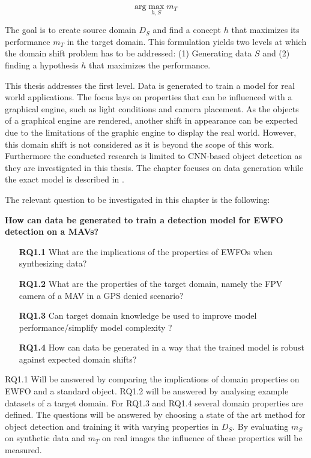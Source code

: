 $$
\text{arg}\max\limits_{h,S} m_T
$$

The goal is to create source domain $D_S$ and find a concept $h$ that maximizes its performance $m_T$ in the target domain. This formulation yields two levels at which the domain shift problem has to be addressed: (1) Generating data $S$ and (2) finding a hypothesis $h$ that maximizes the performance.

This thesis addresses the first level. Data is generated to train a model for real world applications. The focus lays on properties that can be influenced with a graphical engine, such as light conditions and camera placement. As the objects of a graphical engine are rendered, another shift in appearance can be expected due to the limitations of the graphic engine to display the real world. However, this domain shift is not considered as it is beyond the scope of this work. Furthermore the conducted research is limited to \ac{CNN}-based object detection as they are investigated in this thesis. The chapter focuses on data generation while the exact model is described in .

The relevant question to be investigated in this chapter is the following:

\textbf{How can data be generated to train a detection model for \ac{EWFO} detection on a \acp{MAV}?}

\begin{enumerate}
	\item[\textbf{RQ1.1}]What are the implications of the properties of \acp{EWFO} when synthesizing data?
	\item[\textbf{RQ1.2}]What are the properties of the target domain, namely the \ac{FPV} camera of a \ac{MAV} in a GPS denied scenario?
	\item[\textbf{RQ1.3}]Can target domain knowledge be used to improve model performance/simplify model complexity ?
	\item[\textbf{RQ1.4}]How can data be generated in a way that the trained model is robust against expected domain shifts?
\end{enumerate}

RQ1.1 Will be answered by comparing the implications of domain properties on \ac{EWFO} and a standard object. RQ1.2 will be answered by analysing example datasets of a target domain. For RQ1.3 and RQ1.4 several domain properties are defined. The questions will be answered by choosing a state of the art method for object detection and training it with varying properties in $D_S$. By evaluating $m_S$ on synthetic data and $m_T$ on real images the influence of these properties will be measured.

